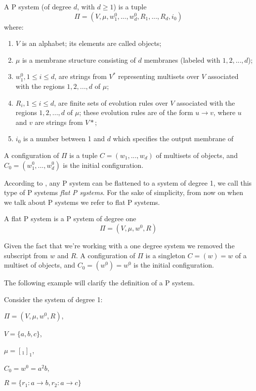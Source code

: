 \begin{definition}[P system]
A P system (of degree $d$, with $d \geq 1$) is a tuple
\[ \Pi = (V,\mu,w^0_1,...,w^0_d,R_1,...,R_d, i_0)\]
where:
\begin{enumerate}
  \item $V$ is an alphabet; its elements are called objects;
  \item $\mu$ is a membrane structure consisting of $d$ membranes (labeled with $1,2,...,d$);
  \item $w^0_1, 1 \leq i \leq d$, are strings from $V^*$ representing multisets over $V$ associated
  with the regions $1,2,...,d$ of $\mu$;
  \item $R_i, 1 \leq i \leq d$, are finite sets of evolution rules over $V$ associated 
  with the regions $1,2,...,d$ of $\mu$; these evolution rules are of the form $u \rightarrow v$,
  where $u$ and $v$ are strings from $V*$;
  \item $i_0$ is a number between 1 and $d$ which specifies the output membrane of %
\end{enumerate}
A configuration of $\Pi$ is a tuple $C=(w_1,...,w_d)$ of multisets of objects, and 
$C_0=(w^0_1,...,w^0_d)$ is the initial configuration.
\end{definition}

According to \cite{agrigoroaiei2010flattening}, any P system can be flattened to a system of degree 1, we call this type of P systems \textit{flat P systems}.
For the sake of simplicity, from now on when we talk about P systems we refer to flat P systems.

\begin{definition}
A flat P system is a P system of degree one
\[ \Pi = (V,\mu,w^0,R) \]

Given the fact that we're working with a one degree system we removed the subscript from $w$ and $R$. 
A configuration of $\Pi$ is a singleton $C=(w)=w$ of a multiset of objects, and 
$C_0=(w^0)=w^0$ is the initial configuration.
\end{definition}

The following example will clarify the definition of a P system.
\begin{example}
\label{ex:flat_membrane}
Consider the system of degree 1:
\begin{description}
   \item $\Pi=(V,\mu,w^0,R)$,
   \item $V=\{a,b,c\}$,
   \item $\mu=[_{1}]_{1}$,
   \item $C_0=w^0=a^2b$,
   \item $R=\{r_1:a \rightarrow b, r_2:a \rightarrow c\}$
\end{description}    
\end{example}

